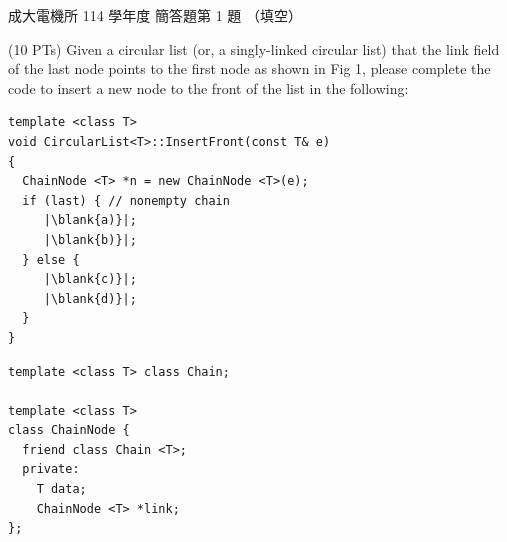\begin{pastexam}[label={px:ncku-114-ee-ds-17}]{成大電機所 114 學年度 簡答題第 1 題}
（填空）

(10 PTs) Given a circular list (or, a singly-linked circular list) that the link field of the last
node points to the first node as shown in Fig 1, please complete the code to insert a new node to
the front of the list in the following:

\begin{minipage}[t]{0.55\textwidth}
\begin{verbatim}
template <class T>
void CircularList<T>::InsertFront(const T& e)
{
  ChainNode <T> *n = new ChainNode <T>(e);
  if (last) { // nonempty chain
     |\blank{a)}|;
     |\blank{b)}|;
  } else {
     |\blank{c)}|;
     |\blank{d)}|;
  }
}
\end{verbatim}
\end{minipage}\hfill
\begin{minipage}[t]{0.4\textwidth}
\begin{verbatim}
template <class T> class Chain;

template <class T>
class ChainNode {
  friend class Chain <T>;
  private:
    T data;
    ChainNode <T> *link;
};
\end{verbatim}
\end{minipage}

\begin{center}
\end{center}
\end{pastexam}

